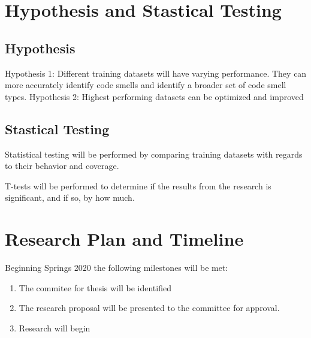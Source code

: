 \documentclass[conference]{IEEEtran}
\begin{document}
\section{Hypothesis and Stastical Testing}
\subsection{Hypothesis}
Hypothesis 1: Different training datasets will have varying performance. They can more accurately identify code smells and identify a broader set of code smell types.
Hypothesis 2: Highest performing datasets can be optimized and improved
\subsection{Stastical Testing}
Statistical testing will be performed by comparing training datasets with regards to their behavior and coverage.

T-tests will be performed to determine if the results from the research is significant, and if so, by how much.

\section{Research Plan and Timeline}
Beginning Springs 2020 the following milestones will be met:
\begin{enumerate}
\item The commitee for thesis will be identified
\item The research proposal will be presented to the committee for approval.
\item Research will begin
\end{enumerate}





\end{document}
